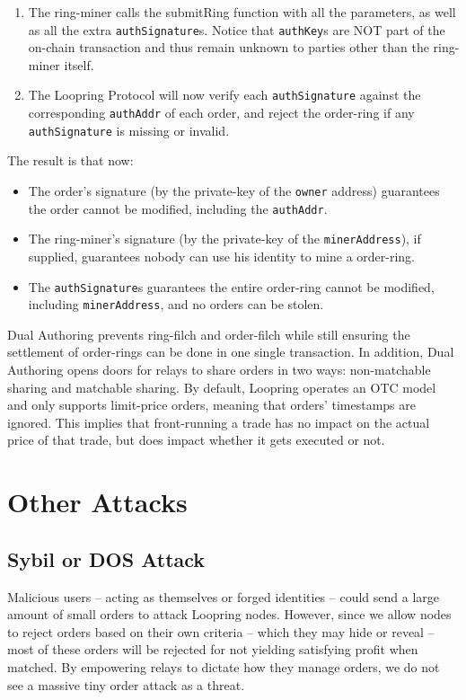 \documentclass[UTF8,nofonts]{article}
\begin{document}
\begin{multicols}{2}
\begin{enumerate}
	\item The ring-miner calls the submitRing function with all the parameters, as well as all the extra \verb|authSignature|s. Notice that \verb|authKey|s are NOT part of the on-chain transaction and thus remain unknown to parties other than the ring-miner itself.


	\item The Loopring Protocol will now verify each \verb|authSignature| against the corresponding \verb|authAddr| of each order, and reject the order-ring if any \verb|authSignature| is missing or invalid.
 
\end{enumerate}

The result is that now:

\begin{itemize}

	\item  The order's signature (by the private-key of the \verb|owner| address) guarantees the order cannot be modified, including the \verb|authAddr|.
	\item  The ring-miner's signature (by the private-key of the \verb|minerAddress|), if supplied, guarantees nobody can use his identity to mine a order-ring.
	\item  The \verb|authSignature|s guarantees the entire order-ring cannot be modified, including \verb|minerAddress|, and no orders can be stolen.

\end{itemize}

Dual Authoring prevents ring-filch and order-filch while still ensuring the settlement of order-rings can be done in one single transaction. In addition, Dual Authoring opens doors for relays to share orders in two ways: non-matchable sharing and matchable sharing. By default, Loopring operates an OTC model and only supports limit-price orders, meaning that orders' timestamps are ignored. This implies that front-running a trade has no impact on the actual price of that trade, but does impact whether it gets executed or not.

\section{Other Attacks}

\subsection{Sybil or DOS Attack}
Malicious users -- acting as themselves or forged identities -- could send a large amount of small orders to attack Loopring nodes. However, since we allow nodes to reject orders based on their own criteria -- which they may hide or reveal -- most of these orders will be rejected for not yielding satisfying profit when matched.  By empowering relays to dictate how they manage orders, we do not see a massive tiny order attack as a threat.


\end{multicols}
\end{document}

